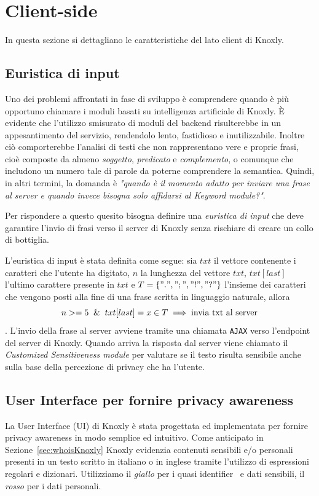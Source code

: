 \section{Client-side}
\label{sec:frontend}
In questa sezione si dettagliano le caratteristiche del lato client di Knoxly.

\subsection{Euristica di input}
\label{ssec:euristicInput}
Uno dei problemi affrontati in fase di sviluppo è comprendere quando è più opportuno chiamare i moduli basati su intelligenza artificiale di Knoxly. È evidente che l'utilizzo smisurato di moduli del backend risulterebbe in un appesantimento del servizio, rendendolo lento, fastidioso e inutilizzabile. Inoltre ciò comporterebbe l'analisi di testi che non rappresentano vere e proprie frasi, cioè composte da almeno \textit{soggetto}, \textit{predicato} e \textit{complemento}, o comunque che includono un numero tale di parole da poterne comprendere la semantica. Quindi, in altri termini, la domanda è\textit{ "quando è il momento adatto per inviare una frase al server e quando invece bisogna solo affidarsi al Keyword module?"}.

Per rispondere a questo quesito bisogna definire una \textit{euristica di input} che deve garantire l'invio di frasi verso il server di Knoxly senza rischiare di creare un collo di bottiglia. 

L'euristica di input è stata definita come segue: sia $txt$ il vettore contenente i caratteri che l'utente ha digitato, $n$ la lunghezza del vettore $txt$, $txt[last]$ l'ultimo carattere presente in $txt$ e $T = \{".", ";", "!", "?"\}$ l'insieme dei caratteri che vengono posti alla fine di una frase scritta in linguaggio naturale, allora
$$ n>=5 \And txt[last] = x \in T \implies \text{invia txt al server}$$.
L'invio della frase al server avviene tramite una chiamata {\tt AJAX} verso l'endpoint del server di Knoxly. Quando arriva la risposta dal server viene chiamato il \textit{Customized Sensitiveness module} per valutare se il testo risulta sensibile anche sulla base della percezione di privacy che ha l'utente.

\subsection{User Interface per fornire privacy awareness}
\label{ssec:ui}


La User Interface (UI) di Knoxly è stata progettata ed implementata per fornire privacy awareness in modo semplice ed intuitivo. Come anticipato in Sezione~\ref{sec:whoisKnoxly} Knoxly evidenzia contenuti sensibili e/o personali presenti in un testo scritto in italiano o in inglese tramite l'utilizzo di espressioni regolari e dizionari. Utilizziamo il \textit{giallo} per i quasi identifier~\cite{} e dati sensibili, il \textit{rosso} per i dati personali. 

